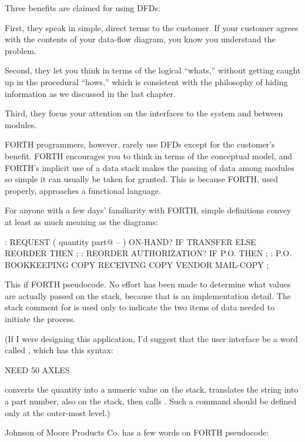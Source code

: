 
Three benefits are claimed for using DFDs:

First, they speak in simple, direct terms to the customer. If your
customer agrees with the contents of your data-flow diagram, you know
you understand the problem.

Second, they let you think in terms of the logical ``whats,'' without
getting caught up in the procedural ``hows,'' which is consistent with the
philosophy of hiding information as we discussed in the last chapter.

Third, they focus your attention on the interfaces to the system and
between modules.

FORTH programmers, however, rarely use DFDs except for the
customer's benefit. FORTH encourages you to think in terms of the
conceptual model, and FORTH's implicit use of a data stack makes the
passing of data among modules so simple it can usually be taken for granted.
This is because FORTH, used properly, approaches a functional
language.

For anyone with a few days' familiarity with FORTH, simple
definitions convey at least as much meaning as the diagrams:

\begin{Code}
: REQUEST ( quantity part@ -- )
   ON-HAND? IF TRANSFER ELSE REORDER THEN ;
: REORDER AUTHORIZATION? IF P.O. THEN ;
: P.O. BOOKKEEPING COPY RECEIVING COPY
   VENDOR MAIL-COPY ;
\end{Code}

This if FORTH pseudocode. No effort has been made to determine what
values are actually passed on the stack, because that is an
implementation detail. The stack comment for  is used
only to indicate the two items of data needed to initiate the process.

(If I were designing this application, I'd suggest that the user
interface be a word called , which has this syntax:

\begin{Code}
NEED 50 AXLES
\end{Code}

\noindent {} converts the quantity into a numeric value on
the stack, translates the string  into a part number,
also on the stack, then calls . Such a command should
be defined only at the outer-most level.)

\blackline{2ex}
\noindent Johnson of Moore Products Co. has a few words on FORTH pseudocode:

